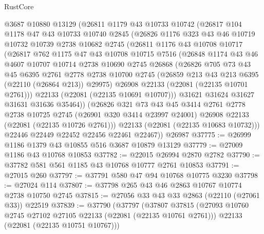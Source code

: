 \begin{lexlean}{RustCore}
\begin{coremodule}
    @3687
    @10880
    @13129
    (@26811
      @1179
      @43
      @10733
      @10742
      (@26817
        @104
        @1178
        @47
        @43
        @10733
        @10740
        @2845
        (@26826
          @1176
          @323
          @43
          @46
          @10719
          @10732
          @10739
          @2738
          @10682
          @2745
          (@26811
            @1176
            @43
            @10708
            @10717
            (@26817
              @762
              @1175
              @47
              @43
              @10708
              @10715
              @7516
              (@26848
                @1174
                @43
                @46
                @4607
                @10707
                @10714
                @2738
                @10690
                @2745
                @26868
                (@26826
                  @705
                  @73
                  @43
                  @45
                  @6395
                  @2761
                  @2778
                  @2738
                  @10700
                  @2745
                  (@26859 @213 @43 @213 @6395 (@22110 (@26864 @213)) @29975)
                  @26908
                  @22133
                  (@22081 (@22135 @10701 @2761)))
                @22133
                (@22081 (@22135 @10691 @10707)))
              @31621
              @31624
              @31627
              @31631
              @31636
              @35464))
          (@26826
            @321
            @73
            @43
            @45
            @3414
            @2761
            @2778
            @2738
            @10725
            @2745
            (@26901 @320 @3414 @23997 @24001)
            @26908
            @22133
            (@22081 (@22135 @10726 @2761)))
          @22133
          (@22081 (@22135 @10683 @10732)))
        @22446
        @22449
        @22452
        @22456
        @22461
        @22467))
    @26987
@37775 := @26999 @1186 @1379 @43 @10855 @516 @3687 @10879 @13129
@37779 := @27009 @1186 @43 @10768 @10853
@37782 := @22015 @26994 @2870 @2782
@37790 := @37782 @581 @561 @1185 @43 @10768 @10777 @2761 @10853
@37791 := @27015 @260
@37797 := @37791 @580 @47 @94 @10768 @10775 @3230
@37798 := @27024 @114
@37807 := @37798 @265 @43 @46 @2863 @10767 @10774 @2738 @10750 @2745
@37815 := @27056 @33 @43 @33 @2863 (@22110 (@27061 @33)) @22519
@37839 := @37790
    (@37797
      (@37807
        @37815
        (@27093 @10760 @2745 @27102 @27105 @22133 (@22081 (@22135 @10761 @2761)))
        @22133
        (@22081 (@22135 @10751 @10767)))

\end{coremodule}
\end{lexlean}
